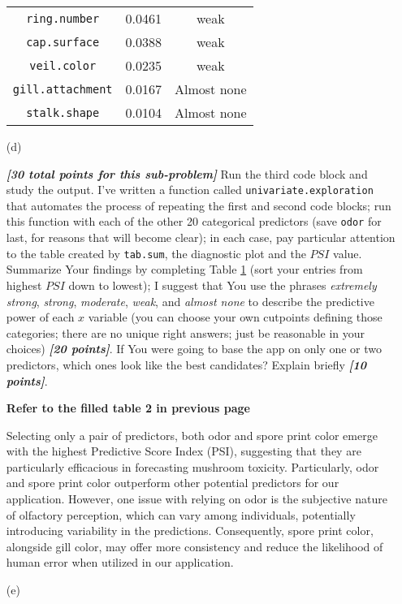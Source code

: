\documentclass[12pt]{article}
\newcommand{\bi}[1]{\b{\i{#1}}}
\renewcommand{\b}[1]{\textbf{#1}}
\renewcommand{\i}[1]{\textit{#1}}
\begin{document}
\begin{itemize}
\begin{table}[t!]
\begin{tabular}{c|cc}
\texttt{ring.number} & 0.0461 & weak \\

\texttt{cap.surface} & 0.0388 & weak \\

\texttt{veil.color} & 0.0235 & weak \\

\texttt{gill.attachment} & 0.0167 & Almost none \\

\texttt{stalk.shape} & 0.0104 & Almost none \\

\end{tabular}

\label{t:summary-table-1}

\end{table}

\item[(d)]

\bi{[30 total points for this sub-problem]} Run the third code block and study the output. I've written a function called \texttt{univariate.exploration} that automates the process of repeating the first and second code blocks; run this function with each of the other 20 categorical predictors (save \texttt{odor} for last, for reasons that will become clear); in each case, pay particular attention to the table created by \texttt{tab.sum}, the diagnostic plot and the $PSI$ value. Summarize Your findings by completing Table \ref{t:summary-table-1} (sort your entries from highest $PSI$ down to lowest); I suggest that You use the phrases \textit{extremely strong}, \textit{strong}, \textit{moderate}, \textit{weak}, and \textit{almost none} to describe the predictive power of each $x$ variable (you can choose your own cutpoints defining those categories; there are no unique right answers; just be reasonable in your choices) \bi{[20 points]}. If You were going to base the app on only one or two predictors, which ones look like the best candidates? Explain briefly \bi{[10 points]}.

{\color{blue}
\textbf{Refer to the filled table 2 in previous page}

Selecting only a pair of predictors, both odor and spore print color emerge with the highest Predictive Score Index (PSI), suggesting that they are particularly efficacious in forecasting mushroom toxicity. Particularly, odor and spore print color outperform other potential predictors for our application. However, one issue with relying on odor is the subjective nature of olfactory perception, which can vary among individuals, potentially introducing variability in the predictions. Consequently, spore print color, alongside gill color, may offer more consistency and reduce the likelihood of human error when utilized in our application.
}
\item[(e)]


\end{itemize}
\end{document}

